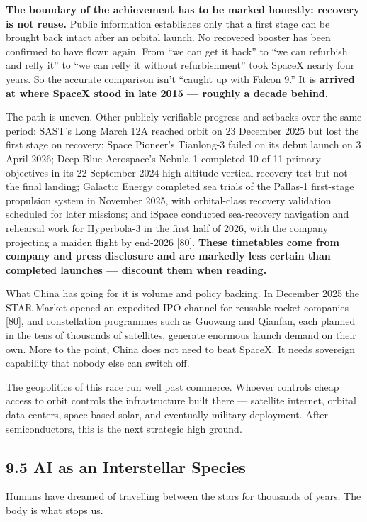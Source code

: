 \documentclass[11pt,a4paper]{article}
\begin{document}
\textbf{The boundary of the achievement has to be marked honestly: recovery is not reuse.} Public information establishes only that a first stage can be brought back intact after an orbital launch. No recovered booster has been confirmed to have flown again. From ``we can get it back'' to ``we can refurbish and refly it'' to ``we can refly it without refurbishment'' took SpaceX nearly four years. So the accurate comparison isn't ``caught up with Falcon 9.'' It is \textbf{arrived at where SpaceX stood in late 2015 --- roughly a decade behind}.

The path is uneven. Other publicly verifiable progress and setbacks over the same period: SAST's Long March 12A reached orbit on 23 December 2025 but lost the first stage on recovery; Space Pioneer's Tianlong-3 failed on its debut launch on 3 April 2026; Deep Blue Aerospace's Nebula-1 completed 10 of 11 primary objectives in its 22 September 2024 high-altitude vertical recovery test but not the final landing; Galactic Energy completed sea trials of the Pallas-1 first-stage propulsion system in November 2025, with orbital-class recovery validation scheduled for later missions; and iSpace conducted sea-recovery navigation and rehearsal work for Hyperbola-3 in the first half of 2026, with the company projecting a maiden flight by end-2026 [80]. \textbf{These timetables come from company and press disclosure and are markedly less certain than completed launches --- discount them when reading.}

What China has going for it is volume and policy backing. In December 2025 the STAR Market opened an expedited IPO channel for reusable-rocket companies [80], and constellation programmes such as Guowang and Qianfan, each planned in the tens of thousands of satellites, generate enormous launch demand on their own. More to the point, China does not need to beat SpaceX. It needs sovereign capability that nobody else can switch off.

The geopolitics of this race run well past commerce. Whoever controls cheap access to orbit controls the infrastructure built there --- satellite internet, orbital data centers, space-based solar, and eventually military deployment. After semiconductors, this is the next strategic high ground.

\subsection{9.5 AI as an Interstellar Species}

Humans have dreamed of travelling between the stars for thousands of years. The body is what stops us.
\end{document}
